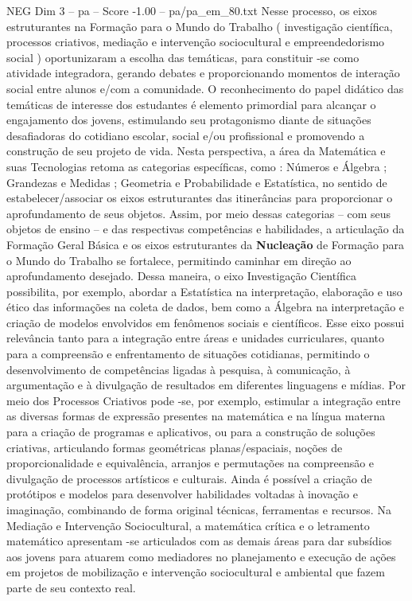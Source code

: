 \begin{textsample}{NEG Dim 3 – pa – Score -1.00 – pa/pa\_em\_80.txt}
Nesse processo, os eixos estruturantes na Formação para o Mundo do Trabalho ( investigação científica, processos criativos, mediação e intervenção sociocultural e empreendedorismo social ) oportunizaram a escolha das temáticas, para constituir -se como atividade integradora, gerando debates e proporcionando momentos de interação social entre alunos e/com a comunidade.
O reconhecimento do papel didático das temáticas de interesse dos estudantes é elemento primordial para alcançar o engajamento dos jovens, estimulando seu protagonismo diante de situações desafiadoras do cotidiano escolar, social e/ou profissional e promovendo a construção de seu projeto de vida.
Nesta perspectiva, a área da Matemática e suas Tecnologias retoma as categorias específicas, como : Números e Álgebra ; Grandezas e Medidas ; Geometria e Probabilidade e Estatística, no sentido de estabelecer/associar os eixos estruturantes das itinerâncias para proporcionar o aprofundamento de seus objetos.
Assim, por meio dessas categorias – com seus objetos de ensino – e das respectivas competências e habilidades, a articulação da Formação Geral Básica e os eixos estruturantes da \textbf{Nucleação} de Formação para o Mundo do Trabalho se fortalece, permitindo caminhar em direção ao aprofundamento desejado.
Dessa maneira, o eixo Investigação Científica possibilita, por exemplo, abordar a Estatística na interpretação, elaboração e uso ético das informações na coleta de dados, bem como a Álgebra na interpretação e criação de modelos envolvidos em fenômenos sociais e científicos.
Esse eixo possui relevância tanto para a integração entre áreas e unidades curriculares, quanto para a compreensão e enfrentamento de situações cotidianas, permitindo o desenvolvimento de competências ligadas à pesquisa, à comunicação, à argumentação e à divulgação de resultados em diferentes linguagens e mídias.
Por meio dos Processos Criativos pode -se, por exemplo, estimular a integração entre as diversas formas de expressão presentes na matemática e na língua materna para a criação de programas e aplicativos, ou para a construção de soluções criativas, articulando formas geométricas planas/espaciais, noções de proporcionalidade e equivalência, arranjos e permutações na compreensão e divulgação de processos artísticos e culturais.
Ainda é possível a criação de protótipos e modelos para desenvolver habilidades voltadas à inovação e imaginação, combinando de forma original técnicas, ferramentas e recursos.
Na Mediação e Intervenção Sociocultural, a matemática crítica e o letramento matemático apresentam -se articulados com as demais áreas para dar subsídios aos jovens para atuarem como mediadores no planejamento e execução de ações em projetos de mobilização e intervenção sociocultural e ambiental que fazem parte de seu contexto real.

\end{textsample}

